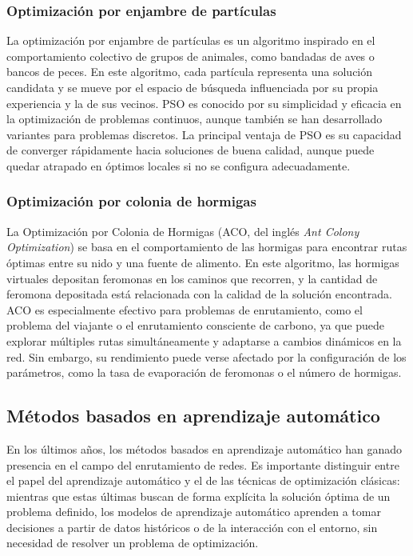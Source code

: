 \subsubsection{Optimización por enjambre de partículas}

La optimización por enjambre de partículas es un algoritmo inspirado en el comportamiento colectivo de grupos de animales, como bandadas de aves o bancos de peces. En este algoritmo, cada partícula representa una solución candidata y se mueve por el espacio de búsqueda influenciada por su propia experiencia y la de sus vecinos. PSO es conocido por su simplicidad y eficacia en la optimización de problemas continuos, aunque también se han desarrollado variantes para problemas discretos. La principal ventaja de PSO es su capacidad de converger rápidamente hacia soluciones de buena calidad, aunque puede quedar atrapado en óptimos locales si no se configura adecuadamente.

\subsubsection{Optimización por colonia de hormigas}

La Optimización por Colonia de Hormigas (ACO, del inglés \textit{Ant Colony Optimization}) se basa en el comportamiento de las hormigas para encontrar rutas óptimas entre su nido y una fuente de alimento. En este algoritmo, las hormigas virtuales depositan feromonas en los caminos que recorren, y la cantidad de feromona depositada está relacionada con la calidad de la solución encontrada. ACO es especialmente efectivo para problemas de enrutamiento, como el problema del viajante o el enrutamiento consciente de carbono, ya que puede explorar múltiples rutas simultáneamente y adaptarse a cambios dinámicos en la red. Sin embargo, su rendimiento puede verse afectado por la configuración de los parámetros, como la tasa de evaporación de feromonas o el número de hormigas.

\subsection{Métodos basados en aprendizaje automático}

En los últimos años, los métodos basados en aprendizaje automático han ganado presencia en el campo del enrutamiento de redes. Es importante distinguir entre el papel del aprendizaje automático y el de las técnicas de optimización clásicas: mientras que estas últimas buscan de forma explícita la solución óptima de un problema definido, los modelos de aprendizaje automático aprenden a tomar decisiones a partir de datos históricos o de la interacción con el entorno, sin necesidad de resolver un problema de optimización.

